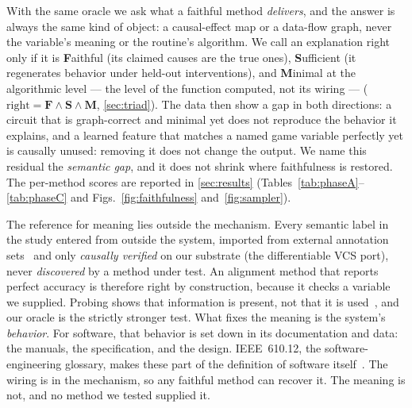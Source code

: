 With the same oracle we ask what a faithful method \emph{delivers}, and the answer is always
the same kind of object: a causal-effect map or a data-flow graph, never the variable's meaning
or the routine's algorithm. We call an explanation right only if it is \textbf{F}aithful (its
claimed causes are the true ones), \textbf{S}ufficient (it regenerates behavior under held-out
interventions), and \textbf{M}inimal at the algorithmic level --- the level of the function
computed, not its wiring ---
($\mathrm{right} = \mathbf{F}\wedge\mathbf{S}\wedge\mathbf{M}$, \Sectionname\ref{sec:triad}).
The data then show a gap in both directions: a circuit that is graph-correct and minimal yet
does not reproduce the behavior it explains, and a learned feature that matches a named game
variable perfectly yet is causally unused: removing it does not change the output. We name this residual the \emph{semantic gap}, and
it does not shrink where faithfulness is restored. The per-method scores are reported in
\Sectionname\ref{sec:results} (Tables~\ref{tab:phaseA}--\ref{tab:phaseC} and
Figs.~\ref{fig:faithfulness} and~\ref{fig:sampler}).

The reference for meaning lies outside the mechanism. Every semantic label in the study entered
from outside the system, imported from external annotation
sets~\cite{anand2019unsupervised,delfosse2023ocatari} and only \emph{causally verified} on our
substrate (the differentiable VCS port), never \emph{discovered} by a method under test. An alignment method that reports
perfect accuracy is therefore right by construction, because it checks a variable we supplied.
Probing shows that information is present, not that it is used~\cite{hewitt2019designing}, and
our oracle is the strictly stronger test. What fixes the meaning is the system's
\emph{behavior}. For software, that behavior is set down in its documentation and data: the
manuals, the specification, and the design. IEEE~610.12, the software-engineering glossary,
makes these part of the definition of software itself~\cite{ieee610}. The wiring is in the mechanism, so any faithful method can
recover it. The meaning is not, and no method we tested supplied it.

